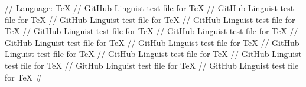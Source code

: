 // Language: TeX
// GitHub Linguist test file for TeX
// GitHub Linguist test file for TeX
// GitHub Linguist test file for TeX
// GitHub Linguist test file for TeX
// GitHub Linguist test file for TeX
// GitHub Linguist test file for TeX
// GitHub Linguist test file for TeX
// GitHub Linguist test file for TeX
// GitHub Linguist test file for TeX
// GitHub Linguist test file for TeX
// GitHub Linguist test file for TeX
// GitHub Linguist test file for TeX
// GitHub Linguist test file for TeX
#
